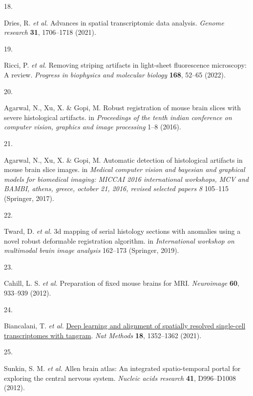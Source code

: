 \documentclass[
  12pt,
]{article}
\newlength{\cslhangindent}
\newlength{\csllabelwidth}
\newenvironment{CSLReferences}[2] %
 {\begin{list}{}{%
  \setlength{\itemindent}{0pt}
  \setlength{\leftmargin}{0pt}
  \setlength{\parsep}{0pt}
  \ifodd #1
   \setlength{\leftmargin}{\cslhangindent}
   \setlength{\itemindent}{-1\cslhangindent}
  \fi
  \setlength{\itemsep}{#2\baselineskip}}}
 {\end{list}}
\newcommand{\CSLLeftMargin}[1]{\parbox[t]{\csllabelwidth}{\strut#1\strut}}
\newcommand{\CSLRightInline}[1]{\parbox[t]{\linewidth - \csllabelwidth}{\strut#1\strut}}
\begin{document}
\begin{CSLReferences}{0}{0}
\CSLLeftMargin{18. }%
\CSLRightInline{Dries, R. \emph{et al.} Advances in spatial
transcriptomic data analysis. \emph{Genome research} \textbf{31},
1706--1718 (2021).}

\CSLLeftMargin{19. }%
\CSLRightInline{Ricci, P. \emph{et al.} Removing striping artifacts in
light-sheet fluorescence microscopy: A review. \emph{Progress in
biophysics and molecular biology} \textbf{168}, 52--65 (2022).}

\CSLLeftMargin{20. }%
\CSLRightInline{Agarwal, N., Xu, X. \& Gopi, M. Robust registration of
mouse brain slices with severe histological artifacts. in
\emph{Proceedings of the tenth indian conference on computer vision,
graphics and image processing} 1--8 (2016).}

\CSLLeftMargin{21. }%
\CSLRightInline{Agarwal, N., Xu, X. \& Gopi, M. Automatic detection of
histological artifacts in mouse brain slice images. in \emph{Medical
computer vision and bayesian and graphical models for biomedical
imaging: MICCAI 2016 international workshops, MCV and BAMBI, athens,
greece, october 21, 2016, revised selected papers 8} 105--115 (Springer,
2017).}

\CSLLeftMargin{22. }%
\CSLRightInline{Tward, D. \emph{et al.} 3d mapping of serial histology
sections with anomalies using a novel robust deformable registration
algorithm. in \emph{International workshop on multimodal brain image
analysis} 162--173 (Springer, 2019).}

\CSLLeftMargin{23. }%
\CSLRightInline{Cahill, L. S. \emph{et al.} Preparation of fixed mouse
brains for MRI. \emph{Neuroimage} \textbf{60}, 933--939 (2012).}

\CSLLeftMargin{24. }%
\CSLRightInline{Biancalani, T. \emph{et al.}
\href{https://doi.org/10.1038/s41592-021-01264-7}{Deep learning and
alignment of spatially resolved single-cell transcriptomes with
tangram}. \emph{Nat Methods} \textbf{18}, 1352--1362 (2021).}

\CSLLeftMargin{25. }%
\CSLRightInline{Sunkin, S. M. \emph{et al.} Allen brain atlas: An
integrated spatio-temporal portal for exploring the central nervous
system. \emph{Nucleic acids research} \textbf{41}, D996--D1008 (2012).}


\end{CSLReferences}
\end{document}
